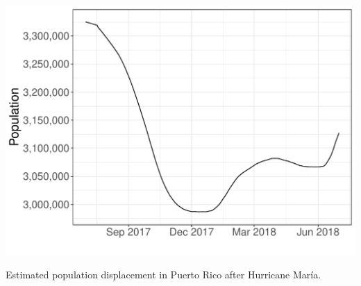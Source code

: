 \documentclass[11pt]{article}
\begin{document}
\begin{suppfigure}[ht]
	\centering
	\includegraphics[width=1\linewidth]{figs/supp-figure-8.pdf}
	\caption{Estimated population displacement in Puerto Rico after Hurricane Mar\'ia.}
	\label{supp-fig:pop-displacement-pr}
\end{suppfigure}
\end{document}

